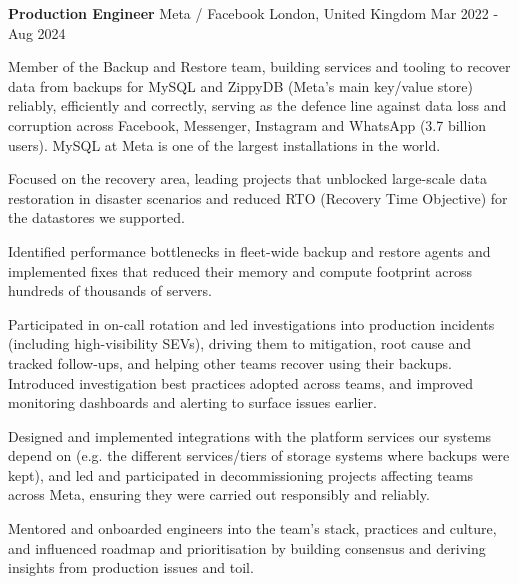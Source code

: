 \begin{cventries}
	\cventry
	{\textbf{Production Engineer}} %
	{Meta / Facebook} %
	{London, United Kingdom} %
	{Mar 2022 - Aug 2024} %
	{
		\begin{cvitems} %
			\item {
			            Member of the Backup and Restore team, building services and tooling to
			            recover data from backups for MySQL and ZippyDB (Meta's main key/value
			            store) reliably, efficiently and correctly, serving as the defence line
			            against data loss and corruption across Facebook, Messenger, Instagram
			            and WhatsApp (3.7 billion users). MySQL at Meta is one of the largest
			            installations in the world.
			      }
			\item {
			            Focused on the recovery area, leading projects that unblocked
			            large-scale data restoration in disaster scenarios and reduced RTO
			            (Recovery Time Objective) for the datastores we supported.
			      }
			\item {
			            Identified performance bottlenecks in fleet-wide backup and restore
			            agents and implemented fixes that reduced their memory and compute
			            footprint across hundreds of thousands of servers.
			      }
			\item {
			            Participated in on-call rotation and led investigations into production
			            incidents (including high-visibility SEVs), driving them to mitigation,
			            root cause and tracked follow-ups, and helping other teams recover using
			            their backups. Introduced investigation best practices adopted across
			            teams, and improved monitoring dashboards and alerting to surface issues
			            earlier.
			      }
			\item {
			            Designed and implemented integrations with the platform services our
			            systems depend on (e.g. the different services/tiers of storage systems
			            where backups were kept), and led and participated in decommissioning
			            projects affecting teams across Meta, ensuring they were carried out
			            responsibly and reliably.
			      }
			\item {
			            Mentored and onboarded engineers into the team's stack, practices and
			            culture, and influenced roadmap and prioritisation by building consensus
			            and deriving insights from production issues and toil.
			      }
		\end{cvitems}
	}


\end{cventries}
